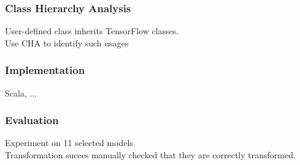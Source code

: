 \documentclass{beamer}
\begin{document}
\begin{frame}
  \frametitle{Class Hierarchy Analysis}
  User-defined class inherits TensorFlow classes.\\
  Use CHA to identify such usages
\end{frame}


\begin{frame}
  \frametitle{Implementation}
  Scala, ...
\end{frame}


\begin{frame}
  \frametitle{Evaluation}
  Experiment on 11 selected models.\\
  Transformation succes
  manually checked that they are correctly transformed.\\
\end{frame}
\end{document}
